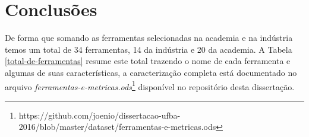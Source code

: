 % 
% 
% 
% 
% 

\section{Conclusões}


De forma que somando as ferramentas selecionadas na academia e na indústria
temos um total de 34 ferramentas, 14 da indústria e 20 da academia.  A Tabela
\ref{total-de-ferramentas} resume este total trazendo o nome de cada ferramenta
e algumas de suas características, a caracterização completa está documentado
no arquivo {\it
ferramentas-e-metricas.ods}\footnote{https://github.com/joenio/dissertacao-ufba-2016/blob/master/dataset/ferramentas-e-metricas.ods}
disponível no repositório desta dissertação.


